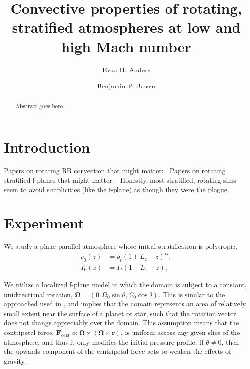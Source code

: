 \documentclass[aps, prl, twocolumn, nofootinbib, groupedaddress, amsfonts, amssymb, amsmath]{revtex4-1}
\begin{document}
\author{Evan H. Anders}
\author{Benjamin P. Brown}
\title{Convective properties of rotating, stratified atmospheres at low and high Mach number}

\begin{abstract}
Abstract goes here.
\end{abstract}
\maketitle


\section{Introduction}
\label{sec:intro}
Papers on rotating RB convection that might matter:
\cite{hathaway&somerville1983, julien&all1996, zhong&all2009, julien&all2012, stellmach&all2014}.
Papers on rotating stratified f-planes that might matter:
\cite{brummell&all1996, brummell&all1998, calkins&all2015a}.  Honestly, most stratified, rotating sims
seem to avoid simplicities (like the f-plane) as though they were the plague.

\section{Experiment} 
\label{sec:experiment}
We study a plane-parallel atmosphere whose initial stratification is polytropic,
\begin{equation}
\begin{split}
\rho_0(z) &= \rho_{t}(1 + L_z - z)^m, \\
T_0(z)    &= T_{t}(1 + L_z - z),
\label{eqn:polytrope}
\end{split}
\end{equation}

We utilize a localized f-plane model in which the domain
is subject to a constant, unidirectional rotation, 
$\bm{\Omega} = (0, \Omega_0 \sin\theta, \Omega_0\cos\theta)$.
This is similar to the approached used in \cite{brummell&all1996}, and
implies that the domain represents an area of relatively small extent near
the surface of a planet or star, such that the rotation vector does not
change appreciably over the domain.  This assumption means that
the centripetal force, 
$\bm{F}_{\text{cent}} \propto \bm{\Omega}\times(\bm{\Omega}\times\bm{r})$,
is uniform across any given slice of the atmosphere, and thus it only modifies the
initial pressure profile.  If $\theta \neq 0$, then the upwards component of the
centripetal force acts to weaken the effects of gravity.
\end{document}
